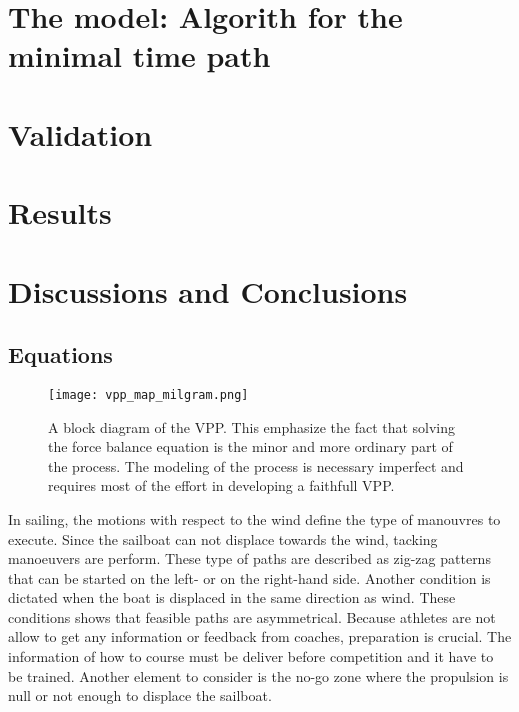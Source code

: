 \section{The model: Algorith for the minimal time path}
\section{Validation}
\section{Results}
\section{Discussions and Conclusions}
\appendix
\subsection{Equations } \label{forces_equations} %
\begin{figure}
\centering
  \texttt{[image: vpp\_map\_milgram.png]}
 \caption{A block diagram of the VPP. This emphasize the fact that solving the force balance equation is the minor and more ordinary part of the process. The modeling of the process is necessary imperfect and requires most of the effort in developing a faithfull VPP. \cite{milgram1998fluid} }
\label{vpp_diagram}
\end{figure}
\newpage

In sailing, the motions with respect to the wind define the type of manouvres to execute.  Since the sailboat can not displace towards the wind, tacking manoeuvers are perform. These type of paths are described as zig-zag patterns that can be started on the left- or on the right-hand side. Another condition is dictated when the boat is displaced in the same direction as wind. These conditions shows that feasible paths are asymmetrical\cite{dolinskaya2012optimal}. Because athletes are not allow to get any information or feedback from coaches, preparation is crucial. The information of how to course must be deliver before competition and it have to be trained. Another element to consider is the no-go zone where the propulsion is null or not enough to displace the sailboat\cite{yang2011control}.\par
